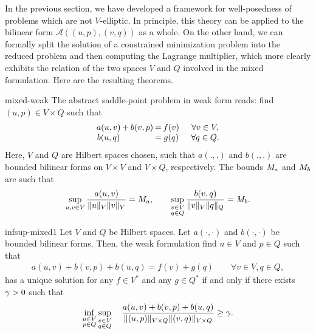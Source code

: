 \begin{intro}
  In the previous section, we have developed a framework for
  well-posedness of problems which are not $V$-elliptic. In principle,
  this theory can be applied to the bilinear form
  $\mathcal A((u,p),(v,q))$ as a whole. On the other hand, we can
  formally split the solution of a constrained minimization problem
  into the reduced problem and then computing the Lagrange multiplier,
  which more clearly exhibits the relation of the two spaces $V$ and
  $Q$ involved in the mixed formulation. Here are the resulting
  theorems.
\end{intro}

\begin{Definition}{mixed-weak}
  The abstract saddle-point problem in weak form reads:
  find $(u,p)\in V\times Q$ such that
  \begin{gather}
    \label{eq:saddle-point-weak}
    \arraycolsep.1em
    \begin{matrix}
      a(u,v) &+& b(v,p) &=& f(v) &\quad&\forall v\in V, \\
      b(u,q) && &=& g(q) &&\forall q\in Q.
    \end{matrix}
  \end{gather}
  Here, $V$ and $Q$ are Hilbert spaces chosen, such that $a(.,.)$ and
  $b(.,.)$ are bounded bilinear forms on $V\times V$ and $V\times Q$,
  respectively. The bounds $M_a$ and $M_b$ are such that
  \begin{gather}
    \label{eq:saddle-point-bounds}
    \sup_{u,v\in V}\frac{a(u,v)}{\lVert u\rVert_V\lVert v\rVert_V} = M_a,
    \qquad
    \sup_{\substack{v\in V\\q\in Q}}\frac{b(v,q)}{\lVert v\rVert_V\lVert q\rVert_Q} = M_b.
  \end{gather}
\end{Definition}


\begin{Theorem}{infsup-mixed1}
  Let $V$ and $Q$ be Hilbert spaces. Let $a(\cdot,\cdot)$ and
  $b(\cdot,\cdot)$ be bounded bilinear forms. Then, the weak
  formulation find $u\in V$ and $p\in Q$ such that
  \begin{gather}
    a(u,v) + b(v,p) + b(u,q)
    = f(v)+g(q)
    \qquad\forall v\in V, q\in Q,
  \end{gather}
  has a unique solution for any $f\in V^*$ and any $g\in Q^*$ if and
  only if there exists $\gamma>0$ such that
  \begin{gather}
    \label{eq:infsup:system-infsup}
    \inf_{\substack{u\in V\\p\in Q}}
    \sup_{\substack{v\in V\\q\in Q}}
    \quad \frac{a(u,v) + b(v,p) + b(u,q)}{\lVert(u,p)\rVert_{V\times
        Q}\lVert(v,q)\rVert_{V\times Q}} \ge \gamma.
  \end{gather}
\end{Theorem}

